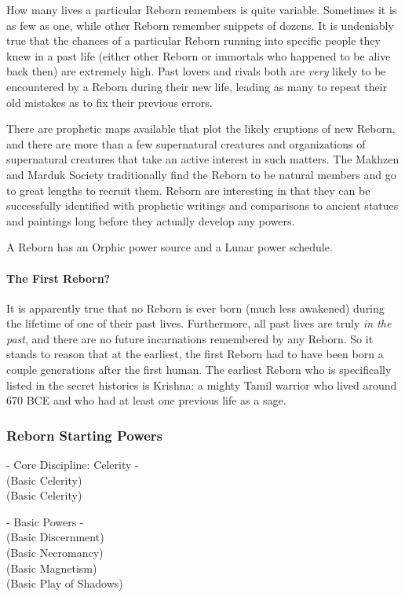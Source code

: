 How many lives a particular Reborn remembers is quite variable. Sometimes it is as few as one, while other Reborn remember snippets of dozens. It is undeniably true that the chances of a particular Reborn running into specific people they knew in a past life (either other Reborn or immortals who happened to be alive back then) are extremely high. Past lovers and rivals both are \textit{very} likely to be encountered by a Reborn during their new life, leading as many to repeat their old mistakes as to fix their previous errors.

There are prophetic maps available that plot the likely eruptions of new Reborn, and there are more than a few supernatural creatures and organizations of supernatural creatures that take an active interest in such matters. The Makhzen and Marduk Society traditionally find the Reborn to be natural members and go to great lengths to recruit them. Reborn are interesting in that they can be successfully identified with prophetic writings and comparisons to ancient statues and paintings long before they actually develop any powers.

A Reborn has an Orphic power source and a Lunar power schedule.
\paragraph{The First Reborn?} It is apparently true that no Reborn is ever born (much less awakened) during the lifetime of one of their past lives. Furthermore, all past lives are truly \textit{in the past}, and there are no future incarnations remembered by any Reborn. So it stands to reason that at the earliest, the first Reborn had to have been born a couple generations after the first human. The earliest Reborn who is specifically listed in the secret histories is Krishna: a mighty Tamil warrior who lived around 670 BCE and who had at least one previous life as a sage.

\subsubsection{Reborn Starting Powers}

\hspace{\parindent} - Core Discipline: Celerity -\\
 (Basic Celerity)\\
 (Basic Celerity)

- Basic Powers -\\
 (Basic Discernment)\\
 (Basic Necromancy)\\
 (Basic Magnetism)\\
 (Basic Play of Shadows)

